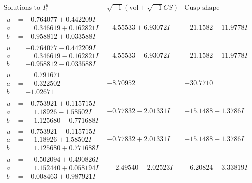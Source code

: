 \documentclass[1p]{elsarticle_modified}
\theoremstyle{definition}
\newcommand{\I}{\sqrt{-1}}
\begin{document}
$$\begin{array}{c|c|c}  
\text{Solutions to }I^u_{1}& \I (\text{vol} + \sqrt{-1}CS) & \text{Cusp shape}\\
 \hline 
\begin{aligned}
u &= -0.764077 + 0.442209 I \\
a &= \phantom{-}0.346619 + 0.162821 I \\
b &= -0.958812 + 0.033588 I\end{aligned}
 & -4.55533 + 6.93072 I & -21.1582 - 11.9778 I \\ \hline\begin{aligned}
u &= -0.764077 - 0.442209 I \\
a &= \phantom{-}0.346619 - 0.162821 I \\
b &= -0.958812 - 0.033588 I\end{aligned}
 & -4.55533 - 6.93072 I & -21.1582 + 11.9778 I \\ \hline\begin{aligned}
u &= \phantom{-}0.791671\phantom{ +0.000000I} \\
a &= \phantom{-}0.322502\phantom{ +0.000000I} \\
b &= -1.02671\phantom{ +0.000000I}\end{aligned}
 & -8.70952\phantom{ +0.000000I} & -30.7710\phantom{ +0.000000I} \\ \hline\begin{aligned}
u &= -0.753921 + 0.115715 I \\
a &= \phantom{-}1.18926 - 1.58502 I \\
b &= \phantom{-}1.125680 - 0.771688 I\end{aligned}
 & -0.77832 - 2.01331 I & -15.1488 + 1.3786 I \\ \hline\begin{aligned}
u &= -0.753921 - 0.115715 I \\
a &= \phantom{-}1.18926 + 1.58502 I \\
b &= \phantom{-}1.125680 + 0.771688 I\end{aligned}
 & -0.77832 + 2.01331 I & -15.1488 - 1.3786 I \\ \hline\begin{aligned}
u &= \phantom{-}0.502094 + 0.490826 I \\
a &= \phantom{-}1.152440 + 0.058194 I \\
b &= -0.008463 + 0.987921 I\end{aligned}
 & \phantom{-}2.49540 - 2.02523 I & -6.20824 + 3.33819 I \\ \hline\begin{aligned}

\end{aligned}
\end{array}$$
\end{document}
